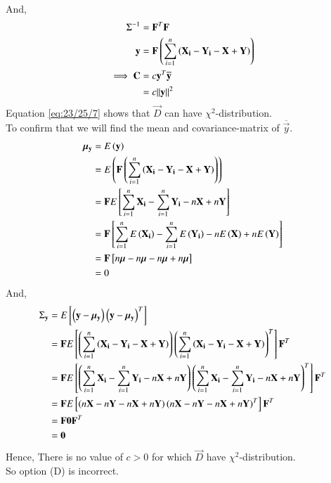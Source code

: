 \documentclass[journal,12pt,onecolumn]{IEEEtran}
\theoremstyle{remark}
\begin{document}
\begin{enumerate}[label=(\alph*)]
\begin{align}
\end{align}
And,
\begin{align}
{\Sigma}^{-1} &= {\mathbf{F}}^T\mathbf{F}  \\
\mathbf{y} &= \mathbf{F}\left(\sum_{i=1}^{n}\left(\mathbf{X_i}-\mathbf{Y_i}-\mathbf{X}+\mathbf{Y}\right)\right) \\
\implies \mathbf{C} &= c{\mathbf{y}}^T\overline{\mathbf{y}} \\
                 &= c{\left\lVert\mathbf{y}\right\rVert}^2  \label{eq:23/25/7}
\end{align}
Equation \eqref{eq:23/25/7} shows that $\vec{D}$ can have ${\chi}^2$-distribution. \\
To confirm that we will find the mean and covariance-matrix of $\overline{\vec{y}}$.
\begin{align}
{\bm{\mu}}_{\mathbf{y}} &= E\left(\mathbf{y}\right) \\
                     &= E\left(\mathbf{F}\left(\sum_{i=1}^{n}\left(\mathbf{X_i}-\mathbf{Y_i}-\mathbf{X}+\mathbf{Y}\right)\right)\right) \\
                     &= \mathbf{F}E{}\left[\sum_{i=1}^{n}\mathbf{X_i}-\sum_{i=1}^{n}\mathbf{Y_i}-n\mathbf{X}+n\mathbf{Y}\right] \\
                     &= \mathbf{F}{}\left[\sum_{i=1}^{n}E\left(\mathbf{X_i}\right)-\sum_{i=1}^{n}E\left(\mathbf{Y_i}\right)-nE\left(\mathbf{X}\right)+nE\left(\mathbf{Y}\right)\right] \\
                     &= \mathbf{F}{}\left[n\bm{\mu}-n\bm{\mu}-n\bm{\mu}+n\bm{\mu}\right] \\
                     &= 0
\end{align}
And,
\begin{align}
{\Sigma}_{\mathbf{y}} &= E{}\left[\left(\mathbf{y}-{\bm{\mu}}_{\mathbf{y}}\right){\left(\mathbf{y}-{\bm{\mu}}_{\mathbf{y}}\right)}^T\right] \\
                   &= \mathbf{F}E{}\left[\left(\sum_{i=1}^{n}\left(\mathbf{X_i}-\mathbf{Y_i}-\mathbf{X}+\mathbf{Y}\right)\right){\left(\sum_{i=1}^{n}\left(\mathbf{X_i}-\mathbf{Y_i}-\mathbf{X}+\mathbf{Y}\right)\right)}^T\right]{\mathbf{F}}^T \\
                   &= \mathbf{F}E{}\left[\left(\sum_{i=1}^{n}\mathbf{X_i}-\sum_{i=1}^{n}\mathbf{Y_i}-n\mathbf{X}+n\mathbf{Y}\right){\left(\sum_{i=1}^{n}\mathbf{X_i}-\sum_{i=1}^{n}\mathbf{Y_i}-n\mathbf{X}+n\mathbf{Y}\right)}^T\right]{\mathbf{F}}^T \\
                   &= \mathbf{F}E{}\left[\left(n\mathbf{X}-n\mathbf{Y}-n\mathbf{X}+n\mathbf{Y}\right){\left(n\mathbf{X}-n\mathbf{Y}-n\mathbf{X}+n\mathbf{Y}\right)}^T\right]{\mathbf{F}}^T \\
                   &= \mathbf{F}\bm{0}{\mathbf{F}}^T  \\
                   &= \bm{0} 
\end{align}
Hence, There is no value of $c>0$ for which $\vec{D}$ have ${\chi}^2$-distribution.\\
So option (D) is incorrect.
\end{enumerate}
\end{document}
